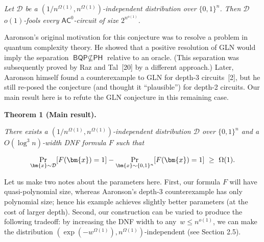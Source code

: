 \emph{Let $\mathcal{D}$ be a $(1/n^{\Omega(1)},n^{\Omega(1)})$-independent distribution over $\{0,1\}^{n}$. Then $\mathcal{D}$ $o(1)$-fools every $\textsf{AC}^{0}$-circuit of size $2^{n^{o(1)}}$.}\par






Aaronson’s original motivation for this conjecture was to resolve a problem in quantum complexity theory. He showed that a positive resolution of GLN would imply the separation $\textsf{BQP}\nsubseteq\textsf{PH}$ relative to an oracle. (This separation was subsequently proved by Raz and Tal [20] by a different approach.) Later, Aaronson himself found a counterexample to GLN for depth-3 circuits [2], but he still re-posed the conjecture (and thought it “plausible”) for depth-2 circuits. Our main result here is to refute the GLN conjecture in this remaining case.\par





\par\medskip\noindent\textbf{
\textbf{Theorem 1}\textbf{ }(Main result)\textbf{.}
}\par



\emph{There exists a $(1/n^{\Omega(1)},n^{\Omega(1)})$-independent distribution $\mathcal{D}$ over $\{0,1\}^{n}$ and a $O(\log^{3}n)$-width DNF formula $F$ such that}\par


\[\begin{gathered}
\Pr_{\bm{x}\sim\mathcal{D}}[F(\bm{x})=1]-\Pr_{\bm{x}\sim\{0,1\}^{n}}[F(\bm{x})=1]\nobreak\ \geq\nobreak\ \Omega(1).
\end{gathered}\]






Let us make two notes about the parameters here.
First, our formula $F$ will have quasi-polynomial size, whereas Aaronson’s depth-3 counterexample has only polynomial size; hence his example achieves slightly better parameters (at the cost of larger depth). Second, our construction can be varied to produce the following tradeoff: by increasing the DNF width to any $w\leq n^{o(1)}$, we can make the distribution $(\exp(-w^{\Omega(1)}),n^{\Omega(1)})$-independent (see Section 2.5).\par




